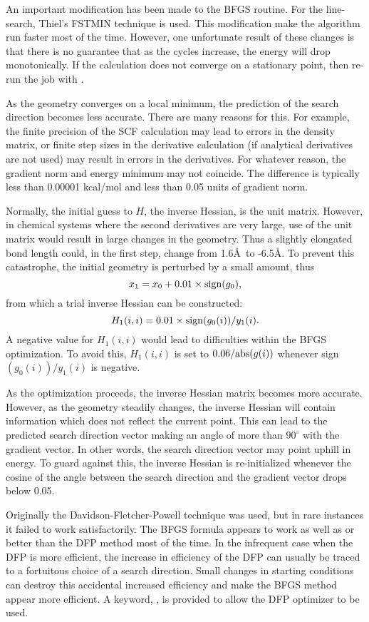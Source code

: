 An  important modification has  been made to the BFGS routine.  For the
line-search, Thiel's FSTMIN technique is used. This  modification make the
algorithm run faster most of the time.  However, one unfortunate result of
these changes is that there is no guarantee that as  the cycles increase, the
energy will drop monotonically.  If the calculation does not converge on a
stationary point, then re-run the job with .

As the geometry converges on a local minimum, the prediction of the search
direction becomes less accurate. There are many reasons for this. For example,
the finite precision of the SCF calculation may lead to errors in the density
matrix, or finite step sizes in the derivative calculation (if analytical
derivatives are not used) may result in errors in the derivatives. For whatever
reason, the gradient norm and energy minimum may not coincide. The difference
is typically less than 0.00001 kcal/mol and less than 0.05 units of gradient
norm. 

Normally, the initial guess to $H$, the inverse Hessian, is the unit matrix.
However, in chemical systems where the second derivatives are very large, use
of the unit matrix would result in large changes in the geometry. Thus a
slightly elongated bond length could, in the first step, change from 1.6\AA\ 
to -6.5\AA  . To prevent this catastrophe, the initial geometry is perturbed by
a small amount, thus
$$
   x_1=x_0+0.01\times {\rm sign}(g_0),
$$
from which a trial inverse Hessian can be constructed:
$$
  H_1(i,i)=0.01\times {\rm sign}(g_0(i))/y_1(i).
$$
A negative value for $H_1(i,i)$ would lead to difficulties
within the BFGS optimization. To avoid this, $H_1(i,i)$ is set
to $0.06/{\rm abs}(g(i))$ whenever sign$(g_0(i))/y_1(i)$ is negative.

As the optimization proceeds, the inverse Hessian matrix becomes more accurate.
However, as the geometry steadily changes, the inverse Hessian will contain
information which does not reflect the current point. This can lead to the
predicted search direction vector making an angle of more than $90^{\circ}$
with the gradient vector. In other words, the search direction vector may point
uphill in energy. To guard against this, the inverse Hessian is re-initialized
whenever the cosine of the angle between the search direction and the gradient
vector drops below 0.05.

Originally the Davidson-Fletcher-Powell technique was used, but in rare
instances it failed to work satisfactorily. The BFGS formula appears to work as
well as or better than the DFP method most of the time. In the infrequent case
when the DFP is more efficient, the increase in efficiency of the DFP can
usually be traced to a fortuitous choice of a search direction. Small changes
in starting conditions can destroy this accidental increased efficiency and
make the BFGS method appear more efficient. A keyword, \comp{DFP}, is provided
to allow the DFP optimizer to be used.


